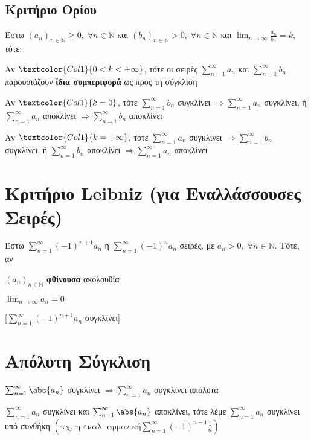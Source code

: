 \documentclass[a4paper,table]{report}
\begin{document}
\subsection{Κριτήριο Ορίου}
Έστω $ {(a_{n})}_{n \in \mathbb{N}} \geq 0, \; \forall n \in \mathbb{N} $ και $
{(b_{n})}_{n \in \mathbb{N}} > 0, \; \forall n \in \mathbb{N} $ 
και $ \lim_{n \to \infty} \frac{a_{n}}{b_{n}} = k  $, τότε: 
\begin{myitemize}
  \item Αν $ \textcolor{Col1}{0 < k < + \infty} $, τότε οι σειρές $ \sum_{n=1}^{\infty} a_{n} $ και $
    \sum_{n=1}^{\infty} b_{n} $ παρουσιάζουν \textbf{ίδια συμπεριφορά} ως προς τη σύγκλιση
  \item Αν $ \textcolor{Col1}{k=0} $, τότε $\sum_{n=1}^{\infty} b_{n} $ συγκλίνει 
    $ \Rightarrow  \sum_{n=1}^{\infty} a_{n} $ συγκλίνει, ή $ \sum_{n=1}^{\infty} a_{n} $
    αποκλίνει $ \Rightarrow \sum_{n=1}^{\infty} b_{n} $ αποκλίνει
  \item Αν $ \textcolor{Col1}{k=+ \infty} $, τότε $\sum_{n=1}^{\infty} a_{n} $ συγκλίνει 
    $ \Rightarrow  \sum_{n=1}^{\infty} b_{n} $ συγκλίνει, ή $ \sum_{n=1}^{\infty} b_{n} $
    αποκλίνει $ \Rightarrow \sum_{n=1}^{\infty} a_{n} $ αποκλίνει
\end{myitemize}

\section{Κριτήριο Leibniz (για Εναλλάσσουσες Σειρές)}

Έστω $ \sum_{n=1}^{\infty} (-1)^{n+1} a_{n} $ ή $ \sum_{n=1}^{\infty} (-1)^{n} a_{n} $ 
σειρές, με $ a_{n} > 0, \; \forall n \in \mathbb{N} $. Τότε, αν 

\parbox{5cm}{
  \begin{myitemize}
    \item $ (a_{n})_{n \in \mathbb{N}} $ \textbf{φθίνουσα} ακολουθία \hfill {}
    \item $ \lim_{n \to \infty} a_{n} = 0 $ \hfill {}
  \end{myitemize}
[$ \sum_{n=1}^{\infty} (-1)^{n+1} a_{n} $ συγκλίνει]}


\section{Απόλυτη Σύγκλιση}

\begin{myitemize}
  \item $ \sum_{n=1}^{\infty} \abs{a_{n}} $ συγκλίνει $ \Rightarrow \sum_{n=1}^{\infty}
    a_{n} $ συγκλίνει \textcolor{Col1}{απόλυτα}
  \item $ \sum_{n=1}^{\infty} a_{n} $ συγκλίνει και $ \sum_{n=1}^{\infty} \abs{a_{n}}
    $ αποκλίνει, τότε λέμε $ \sum_{n=1}^{\infty} a_{n} $ συγκλίνει \textcolor{Col1}{υπό
    συνθήκη} $ \left( \text{πχ. η εναλ. αρμονική} \sum_{n=1}^{\infty} (-1)^{n-1} \frac{1}{n}\right) $
\end{myitemize}
\end{document}
